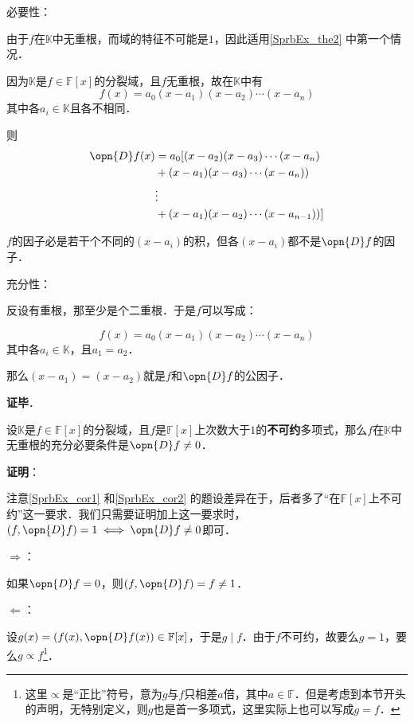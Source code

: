 必要性：

由于$f$在$\mathbb{K}$中无重根，而域的特征不可能是$1$，因此适用\autoref{SprbEx_the2} 中第一个情况．

因为$\mathbb{K}$是$f\in\mathbb{F}[x]$的分裂域，且$f$无重根，故在$\mathbb{K}$中有
\begin{equation}
f(x) = a_0(x-a_1)(x-a_2)\cdots(x-a_n)
\end{equation}
其中各$a_i\in\mathbb{K}$且各不相同．

则
\begin{equation}
\begin{aligned}
\opn{D}f(x) &= a_0[(x-a_2)(x-a_3)\cdots(x-a_n)\\
&+(x-a_1)(x-a_3)\cdots(x-a_n))\\
&\vdots\\
&+(x-a_1)(x-a_2)\cdots(x-a_{n-1}))
]
\end{aligned}
\end{equation}

$f$的因子必是若干个不同的$(x-a_i)$的积，但各$(x-a_i)$都不是$\opn{D}f$的因子．

充分性：

反设有重根，那至少是个二重根．于是$f$可以写成：

\begin{equation}
f(x) = a_0(x-a_1)(x-a_2)\cdots(x-a_n)
\end{equation}
其中各$a_i\in\mathbb{K}$，且$a_1=a_2$．

那么$(x-a_1)=(x-a_2)$就是$f$和$\opn{D}f$的公因子．

\textbf{证毕}．



\begin{corollary}{}\label{SprbEx_cor2}
设$\mathbb{K}$是$f\in\mathbb{F}[x]$的分裂域，且$f$是$\mathbb{F}[x]$上次数大于$1$的\textbf{不可约}多项式，那么$f$在$\mathbb{K}$中无重根的充分必要条件是$\opn{D}f \neq 0$．
\end{corollary}

\textbf{证明}：

注意\autoref{SprbEx_cor1} 和\autoref{SprbEx_cor2} 的题设差异在于，后者多了“在$\mathbb{F}[x]$上不可约”这一要求．我们只需要证明加上这一要求时，$(f, \opn{D}f)=1 \iff \opn{D}f\neq 0$即可．

$\Rightarrow$：

如果$\opn{D}f=0$，则$(f, \opn{D}f)=f\neq 1$．

$\Leftarrow$：

设$g(x)=(f(x), \opn{D}f(x))\in\mathbb{F}[x]$，于是$g\mid f$．由于$f$不可约，故要么$g=1$，要么$g\propto f$\footnote{这里$\propto$是“正比”符号，意为$g$与$f$只相差$a$倍，其中$a\in\mathbb{F}$．但是考虑到本节开头的声明，无特别定义，则$g$也是首一多项式，这里实际上也可以写成$g=f$．}．

